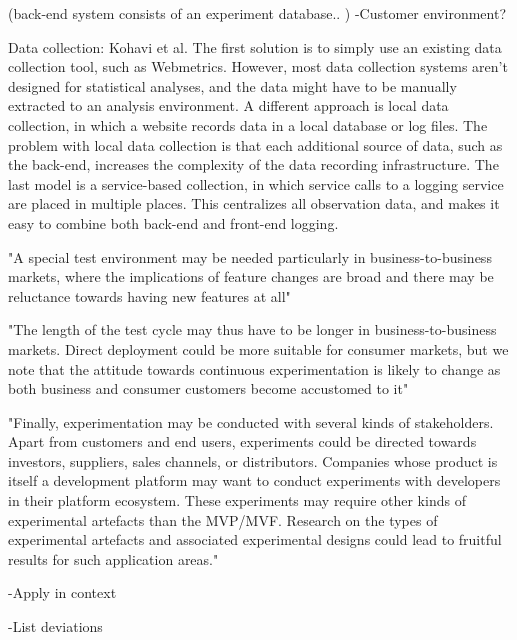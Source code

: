 \documentclass[english]{tktltiki2}
\theoremstyle{definition}
\theoremstyle{remark}
\begin{document}
(back-end system consists of an experiment database.. ) 
-Customer environment?

Data collection: Kohavi et al.
The first solution is to simply use an existing data collection tool, such as Webmetrics. However, most data collection systems aren't designed for statistical analyses, and the data might have to be manually extracted to an analysis environment. A different approach is local data collection, in which a website records data in a local database or log files. The problem with local data collection is that each additional source of data, such as the back-end, increases the complexity of the data recording infrastructure. The last model is a service-based collection, in which service calls to a logging service are placed in multiple places. This centralizes all observation data, and makes it easy to combine both back-end and front-end logging. 

"A special test environment may be needed particularly in business-to-business markets, where the implications of feature changes are broad and there may be reluctance towards having new features at all"

"The length of the test cycle may thus have to be longer in business-to-business markets. Direct deployment could be more suitable for consumer markets, but we note that the attitude towards continuous experimentation is likely to change as both business and consumer customers become accustomed to it"

"Finally, experimentation may be conducted with several kinds of stakeholders. Apart from customers and end users, experiments could be directed towards investors, suppliers, sales channels, or distributors. Companies whose product is itself a development platform may want to conduct experiments with developers in their platform ecosystem. These experiments may require other kinds of experimental artefacts than the MVP/MVF. Research on the types of experimental artefacts and associated experimental designs could lead to fruitful results for such application areas."

-Apply in context

-List deviations

\end{document}
